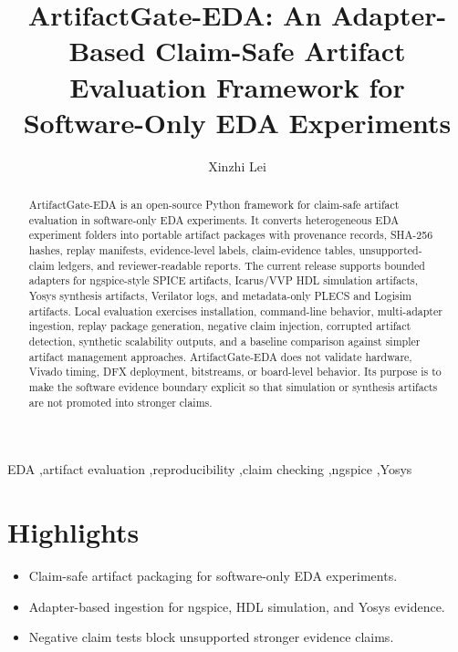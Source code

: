 \documentclass[preprint,12pt]{elsarticle}
\begin{document}
\begin{frontmatter}

\title{ArtifactGate-EDA: An Adapter-Based Claim-Safe Artifact Evaluation Framework for Software-Only EDA Experiments}

\author[inst1]{Xinzhi Lei}

\begin{abstract}
ArtifactGate-EDA is an open-source Python framework for claim-safe artifact
evaluation in software-only EDA experiments. It converts heterogeneous EDA
experiment folders into portable artifact packages with provenance records,
SHA-256 hashes, replay manifests, evidence-level labels, claim-evidence tables,
unsupported-claim ledgers, and reviewer-readable reports. The current release
supports bounded adapters for ngspice-style SPICE artifacts, Icarus/VVP HDL
simulation artifacts, Yosys synthesis artifacts, Verilator logs, and
metadata-only PLECS and Logisim artifacts. Local evaluation exercises
installation, command-line behavior, multi-adapter ingestion, replay package
generation, negative claim injection, corrupted artifact detection, synthetic
scalability outputs, and a baseline comparison against simpler artifact
management approaches. ArtifactGate-EDA does not validate hardware, Vivado
timing, DFX deployment, bitstreams, or board-level behavior. Its purpose is to
make the software evidence boundary explicit so that simulation or synthesis
artifacts are not promoted into stronger claims.
\end{abstract}

\begin{keyword}
EDA \sep artifact evaluation \sep reproducibility \sep claim checking \sep ngspice \sep Yosys
\end{keyword}

\end{frontmatter}

\section*{Highlights}
\begin{itemize}
\item Claim-safe artifact packaging for software-only EDA experiments.
\item Adapter-based ingestion for ngspice, HDL simulation, and Yosys evidence.
\item Negative claim tests block unsupported stronger evidence claims.
\end{itemize}
\end{document}
